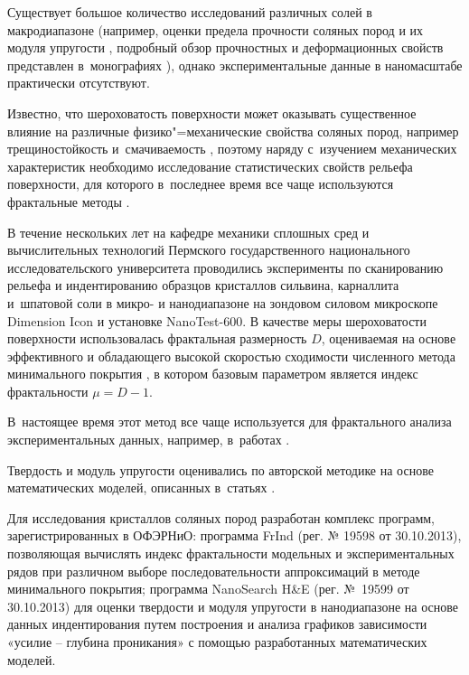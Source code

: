Существует большое количество исследований различных солей в макродиапазоне (например, оценки предела прочности соляных пород и их модуля упругости \cite{l6}, подробный обзор прочностных и деформационных свойств представлен в~монографиях \cite{l16,l21}), однако экспериментальные данные в наномасштабе практически отсутствуют. 

Известно, что шероховатость поверхности может оказывать существенное влияние на различные физико"=механические свойства соляных пород, например трещиностойкость \cite{l1,l17}  и~смачиваемость \cite{l1}, поэтому наряду с~изучением механических характеристик необходимо исследование статистических свойств рельефа поверхности, для которого в~последнее время все чаще используются фрактальные методы \cite{l22}. 



В течение нескольких лет на кафедре механики сплошных сред и вычислительных технологий Пермского государственного национального исследовательского университета проводились эксперименты по сканированию рельефа и индентированию \cite{l11,l23} образцов кристаллов сильвина, карналлита и~шпатовой соли в микро- и нанодиапазоне на зондовом силовом микроскопе Dimension Icon и установке NanoTest-600. В качестве меры шероховатости поверхности использовалась фрактальная размерность $D$, оцениваемая на основе эффективного и обладающего высокой скоростью сходимости численного метода минимального покрытия \cite{l13,l14,l27}, в котором базовым параметром является индекс фрактальности $\mu=D-1$. 

В~настоящее время этот метод все чаще используется для фрактального анализа экспериментальных данных, например, в~работах \cite{l8,l9}. 

Твердость и модуль упругости оценивались по авторской методике на основе математических моделей, описанных в~статьях \cite{l2,l4}. 



Для исследования кристаллов соляных пород разработан комплекс программ, зарегистрированных в ОФЭРНиО: программа FrInd (рег. № 19598 от 30.10.2013), позволяющая вычислять индекс фрактальности модельных и экспериментальных рядов при различном выборе последовательности аппроксимаций в методе минимального покрытия; программа NanoSearch H\&E (рег. №~19599 от 30.10.2013) для оценки твердости и модуля упругости в нанодиапазоне на основе данных индентирования путем построения и анализа графиков зависимости «усилие – глубина проникания» с помощью разработанных математических моделей. 





